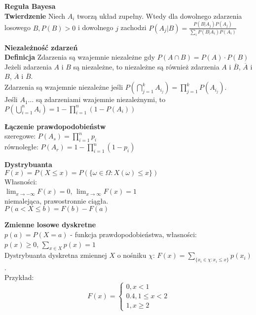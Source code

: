 \documentclass[10pt,landscape,a4paper,notitlepage]{article}
\begin{document}
\begin{multicols*}{4}
        \noindent \textbf{\large Reguła Bayesa}\\
        \textbf{Twierdzenie} Niech $A_i$ tworzą układ zupełny. Wtedy dla dowolnego zdarzenia losowego $B, P(B)>0$ i dowolnego $j$ zachodzi $P(A_j|B)=\frac{P(B|A_j)P(A_j)}{\sum_iP(B|A_i)P(A_i)}$

        \noindent \textbf{\large Niezależność zdarzeń}\\
        \textbf{Definicja} Zdarzenia są wzajemnie niezależne gdy $P(A\cap B)=P(A)\cdot P(B)$\\
        Jeżeli zdarzenia $A$ i $B$ są niezależne, to niezależne są również zdarzenia $A$ i $\overline{B}$, $\overline{A}$ i $B$, $\overline{A}$ i $\overline{B}$.\\
        Zdarzenia są wzajemnie niezależne jeśli $P\left(\bigcap_{j=1}^kA_{i_j}\right) = \prod_{j=1}^kP(A_{i_j})$.\\
        Jeśli $A_1\ldots$ są zdarzeniami wzajemnie niezależnymi, to $P\left(\bigcup_{i=1}^nA_i\right)=1-\prod_{i=1}^n(1-P(A_i))$

        \noindent\textbf{\large Łączenie prawdopodobieństw}\\
        szeregowe: $P(A_s)=\prod_{i=1}^np_i$\\
        równoległe: $P(A_r)=1-\prod_{i=1}^n(1-p_i)$

        \noindent\textbf{\large Dystrybuanta}\\
        $F(x)=P(X\leq x) = P(\{\omega\in\Omega : X(\omega)\leq x\})$\\
        Własności:\\
        $\lim_{x\rightarrow-\infty}F(x)=0$, $\lim_{x\rightarrow\infty}F(x)=1$\\
        niemalejąca, prawostronnie ciągła.\\
        $P(a<X\leq b)=F(b)-F(a)$

        \noindent\textbf{\large Zmienne losowe dyskretne}\\
        $p(a) = P(X=a)$ - funkcja prawdopodobieństwa, własności:\\
        $p(x)\geq 0$, $\sum_{x\in X}p(x)=1$\\
        Dystrybuanta dyskretna zmiennej $X$ o nośniku $\chi$: $F(x)=\sum_{\{x_i\in \chi:x_i\leq x\}}p(x_i)$.\\
        Przykład:
        \[
            F(x)=
            \begin{cases}
                0, x<1\\
                0.4, 1\leq x<2\\
                1, x\geq 2
            \end{cases}
        \]
        

\end{multicols*}
\end{document}

